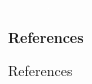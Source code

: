 \documentclass[12pt]{article}
\begin{document}
\begin{figure}[H]
   \centering
   \includegraphics[max width=\textwidth]{Default.png}
   \caption{ }
\end{figure}

\begin{center}
   \textbf{References}
\end{center}
\begin{footnotesize}
   \setlength{\parindent}{0cm}
   \setlength{\parskip}{0.25cm}
   References
\end{footnotesize}
\end{document}
